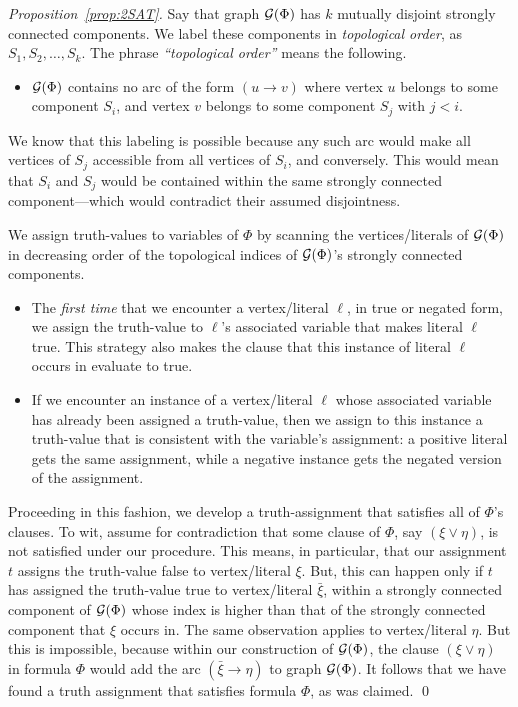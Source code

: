 \begin{proof}[Proposition~\ref{prop:2SAT}]
Say that graph $\mbox{$\cal G$}(\Phi)$ has $k$ mutually disjoint strongly connected
components.  We label these components in {\it topological order},
 as $S_1, S_2, \ldots, S_k$.  The phrase
{\it ``topological order''} means the following.
\begin{itemize}
\item
$\mbox{$\cal G$}(\Phi)$ contains no arc of the form $(u \rightarrow v)$ where
  vertex $u$ belongs to some component $S_i$, and vertex $v$ belongs
  to some component $S_j$ with $j < i$.
\end{itemize}
We know that this labeling is possible because any such arc would make
all vertices of $S_j$ accessible from all vertices of $S_i$, and
conversely.  This would mean that $S_i$ and $S_j$ would be contained
within the same strongly connected component---which would contradict
their assumed disjointness.
\medskip

We assign truth-values to variables of $\Phi$ by scanning the
vertices/literals of $\mbox{$\cal G$}(\Phi)$ in decreasing order of the topological
indices of $\mbox{$\cal G$}(\Phi)$'s strongly connected components.
\begin{itemize}
\item
The {\em first time} that we encounter a vertex/literal $\ell$, in
true or negated form, we assign the truth-value to $\ell$'s associated
variable that makes literal $\ell$ {\sc true}.  This strategy also
makes the clause that this instance of literal $\ell$ occurs in
evaluate to {\sc true}.
\item
If we encounter an instance of a vertex/literal $\ell$ whose
associated variable has already been assigned a truth-value, then we
assign to this instance a truth-value that is consistent with the
variable's assignment: a positive literal gets the same assignment,
while a negative instance gets the negated version of the assignment.
\end{itemize}

Proceeding in this fashion, we develop a truth-assignment that
satisfies all of $\Phi$'s clauses.  To wit, assume for contradiction
that some clause of $\Phi$, say $(\xi \vee \eta)$, is not satisfied
under our procedure.  This means, in particular, that our assignment
$t$ assigns the truth-value {\sc false} to vertex/literal $\xi$.  But,
this can happen only if $t$ has assigned the truth-value {\sc true} to
vertex/literal $\bar{\xi}$, within a strongly connected component of
$\mbox{$\cal G$}(\Phi)$ whose index is higher than that of the strongly connected
component that $\xi$ occurs in.  The same observation applies to
vertex/literal $\eta$.  But this is impossible, because within our
construction of $\mbox{$\cal G$}(\Phi)$, the clause $(\xi \vee \eta)$ in formula
$\Phi$ would add the arc $(\bar{\xi} \rightarrow \eta)$ to graph
$\mbox{$\cal G$}(\Phi)$.  It follows that we have found a truth assignment that
satisfies formula $\Phi$, as was claimed.  \qed
\end{proof}

